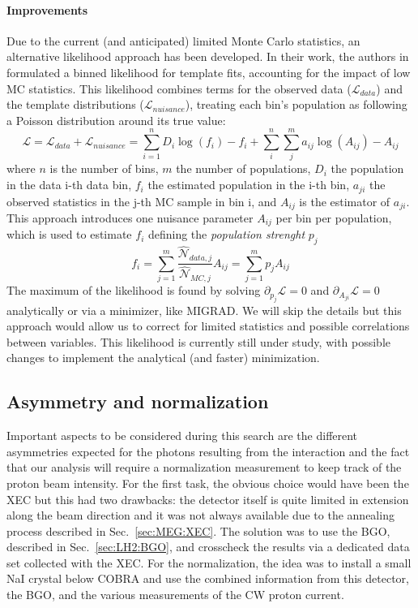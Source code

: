 \begin{refsection}
\paragraph{Improvements}
Due to the current (and anticipated) limited Monte Carlo statistics, an alternative likelihood approach has been developed. 
In their work, the authors in \cite{X17:likelihood:BB} formulated a binned likelihood for template fits, accounting for the impact of low MC statistics. 
This likelihood combines terms for the observed data ($\mathcal{L}_{data}$) and the template distributions ($\mathcal{L}_{nuisance}$), treating each bin's population as following a Poisson distribution around its true value:
\begin{equation}
    \mathcal{L} = \mathcal{L}_{data} + \mathcal{L}_{nuisance} =
    \sum_{i=1}^n D_i \log (f_i) - f_i + \sum_{i}^{n}\sum_{j}^{m}a_{ij}\log (A_{ij})-A_{ij}
\end{equation}
where $n$ is the number of bins, $m$ the number of populations, $D_i$ the population in the data i-th data bin, $f_i$ the estimated population in the i-th bin, $a_{ji}$ the observed statistics in the j-th MC sample in bin i, and $A_{ij}$ is the estimator of $a_{ji}$.
This approach introduces one nuisance parameter $A_{ij}$ per bin per population, which is used to estimate $f_i$ defining the \textit{population strenght} $p_j$
\begin{equation}
    f_i=\sum_{j=1}^m \frac{\hat{\mathcal{N}}_{data,j}}{\hat{\mathcal{N}}_{MC,j}} A_{ij}= \sum_{j=1}^m p_j A_{ij}
\end{equation}
The maximum of the likelihood is found by solving $\partial_{p_j}\mathcal{L}=0$ and  $\partial_{A_{ji}}\mathcal{L}=0$ analytically or via a minimizer, like MIGRAD.
We will skip the details but this approach would allow us to correct for limited statistics and possible correlations between variables.
This likelihood is currently still under study, with possible changes to implement the analytical (and  faster) minimization.

    \subsection{Asymmetry and normalization}
        Important aspects to be considered during this search are the different asymmetries expected for the photons resulting from the interaction and the fact that our analysis will require a normalization measurement to keep track of the proton beam intensity.
        For the first task, the obvious choice would have been the XEC but this had two drawbacks: the detector itself is quite limited in extension along the beam direction and it was not always available due to the annealing process described in Sec.~\ref{sec:MEG:XEC}.
        The solution was to use the BGO, described in Sec.~\ref{sec:LH2:BGO}, and crosscheck the results via a dedicated data set collected with the XEC.
        For the normalization, the idea was to install a small NaI crystal below COBRA and use the combined information from this detector, the BGO, and the various measurements of the CW proton current.



\end{refsection}
